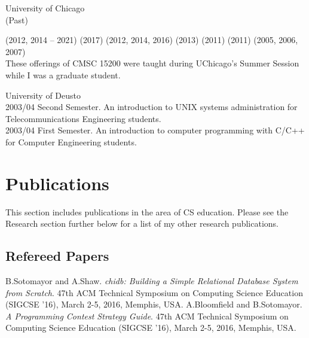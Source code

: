 \documentclass{resume}
\begin{document}
\begin{category}{University of Chicago\\(Past)} 

 (2012, 2014 -- 2021)
 (2017)
 (2012, 2014, 2016)
 (2013)
 (2011)
 (2011)
 (2005, 2006, 2007)\\
These offerings of CMSC 15200 were taught during UChicago's Summer Session while I was a graduate student.
\end{category}

\begin{category}{University of Deusto} 
\\
2003/04 Second Semester. An introduction to UNIX systems administration for Telecommunications Engineering students.
\\
2003/04 First Semester. An introduction to computer programming with C/C++ for Computer Engineering students.
\end{category}

\section*{\hspace{-1cm}Publications}

This section includes publications in the area of CS education. Please see the Research section further below for a list of my other research publications.

\subsection*{Refereed Papers}
\begin{category}{}
\citembullet B.Sotomayor and A.Shaw. \emph{chidb: Building a Simple Relational Database System from Scratch}. 47th ACM Technical Symposium on Computing Science Education (SIGCSE '16), March 2-5, 2016, Memphis, USA.
\citembullet A.Bloomfield and B.Sotomayor. \emph{A Programming Contest Strategy Guide}. 47th ACM Technical Symposium on Computing Science Education (SIGCSE '16), March 2-5, 2016, Memphis, USA.
\end{category}
\end{document}
